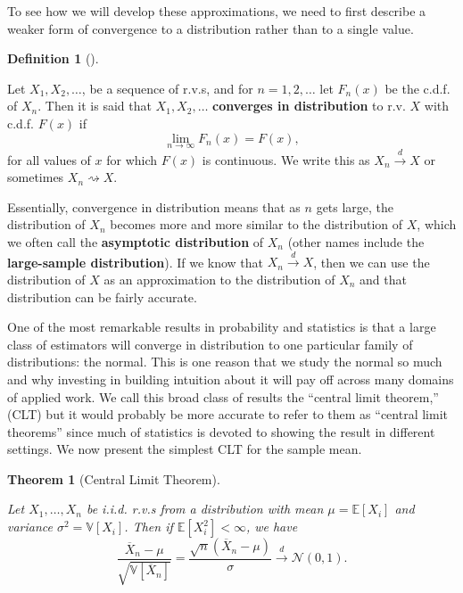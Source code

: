 \documentclass[
  letterpaper,
  DIV=11,
  numbers=noendperiod]{scrreprt}
\newcommand{\E}{\mathbb{E}}
\newcommand{\V}{\mathbb{V}}
\newcommand{\N}{\mathcal{N}}
\newcommand{\Xbar}{\overline{X}}
\newcommand{\indist}{\overset{d}{\to}}
\theoremstyle{definition}
\newtheorem{definition}{Definition}[chapter]
\theoremstyle{plain}
\newtheorem{theorem}{Theorem}[chapter]
\theoremstyle{definition}
\theoremstyle{remark}
\begin{document}
To see how we will develop these approximations, we need to first
describe a weaker form of convergence to a distribution rather than to a
single value.

\leavevmode{}%
\begin{definition}[]\label{def-indist}

Let \(X_1,X_2,\ldots\), be a sequence of r.v.s, and for
\(n = 1,2, \ldots\) let \(F_n(x)\) be the c.d.f. of \(X_n\). Then it is
said that \(X_1,X_2, \ldots\) \textbf{converges in distribution} to r.v.
\(X\) with c.d.f. \(F(x)\) if \[
\lim_{n\rightarrow \infty} F_n(x) = F(x),
\] for all values of \(x\) for which \(F(x)\) is continuous. We write
this as \(X_n \indist X\) or sometimes \(X_n ⇝ X\).

\end{definition}

Essentially, convergence in distribution means that as \(n\) gets large,
the distribution of \(X_n\) becomes more and more similar to the
distribution of \(X\), which we often call the \textbf{asymptotic
distribution} of \(X_n\) (other names include the \textbf{large-sample
distribution}). If we know that \(X_n \indist X\), then we can use the
distribution of \(X\) as an approximation to the distribution of \(X_n\)
and that distribution can be fairly accurate.

One of the most remarkable results in probability and statistics is that
a large class of estimators will converge in distribution to one
particular family of distributions: the normal. This is one reason that
we study the normal so much and why investing in building intuition
about it will pay off across many domains of applied work. We call this
broad class of results the ``central limit theorem,'' (CLT) but it would
probably be more accurate to refer to them as ``central limit theorems''
since much of statistics is devoted to showing the result in different
settings. We now present the simplest CLT for the sample mean.

\leavevmode{}%
\begin{theorem}[Central Limit Theorem]\label{thm-clt}

Let \(X_1, \ldots, X_n\) be i.i.d. r.v.s from a distribution with mean
\(\mu = \E[X_i]\) and variance \(\sigma^2 = \V[X_i]\). Then if
\(\E[X_i^2] < \infty\), we have \[
\frac{\Xbar_n - \mu}{\sqrt{\V[\Xbar_n]}} = \frac{\sqrt{n}\left(\Xbar_n - \mu\right)}{\sigma} \indist \N(0, 1).
\]

\end{theorem}
\end{document}
